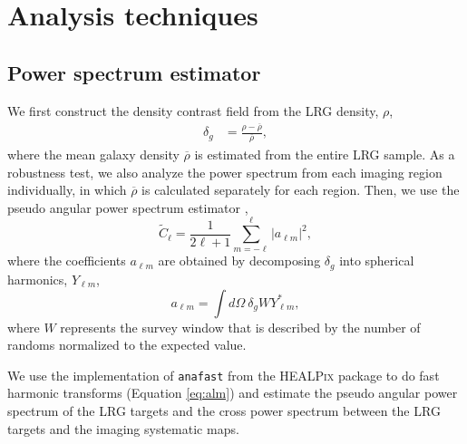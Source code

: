 \section{Analysis techniques}
\label{sec:method} 


\subsection{Power spectrum estimator}
We first construct the density contrast field from the LRG density, $\rho$,
\begin{align}\label{eq:delta}
    \delta_{g} &= \frac{\rho- \overline{\rho}}{\overline{\rho}},
\end{align}
where the mean galaxy density $\overline{\rho}$ is estimated from the entire LRG sample. As a robustness test, we also analyze the power spectrum from each imaging region individually, in which $\overline{\rho}$ is calculated separately for each region. Then, we use the pseudo angular power spectrum estimator \citep{hivon2002master},
\begin{equation}\label{eq:pusedocell}
        \tilde{C}_{\ell} = \frac{1}{2\ell +1} \sum_{m=-\ell}^{\ell} |a_{\ell m}|^{2},
\end{equation}
where the coefficients $a_{\ell m}$ are obtained by decomposing $\delta_{g}$ into spherical harmonics, $Y_{\ell m}$,
\begin{equation}\label{eq:alm}
        a_{\ell m} = \int d\Omega ~ \delta_{g} W Y^{*}_{\ell m},
\end{equation}
where $W$ represents the survey window that is described by the number of randoms normalized to the expected value.

We use the implementation of \texttt{anafast} from the \textsc{HEALPix} package \citep{gorski2005healpix} to do fast harmonic transforms (Equation \ref{eq:alm}) and estimate the pseudo angular power spectrum of the LRG targets and the cross power spectrum between the LRG targets and the imaging systematic maps.

